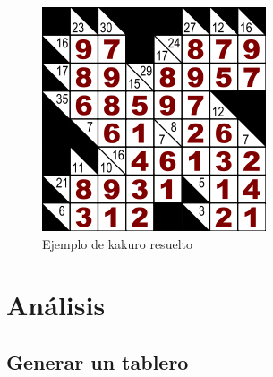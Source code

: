 \documentclass[journal]{IEEEtran}
\begin{document}
\begin{figure}[h] 
        \centering \includegraphics[width=.35\columnwidth]{kakuro_solved.png}
        \caption{
                \label{fig:samplesetup}
                Ejemplo de kakuro resuelto
        }
\end{figure}

\section{Análisis}
\subsection{Generar un tablero}
\end{document}
